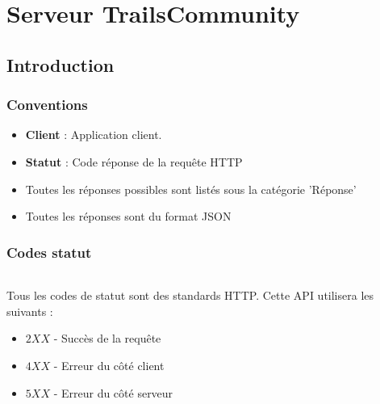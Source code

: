 \documentclass[titlepage, 12pt]{report}
\begin{document}


\part{Serveur TrailsCommunity}

\chapter{Introduction}

\section{Conventions}
\begin{itemize}
	\item \textbf{Client} : Application client.
	\item \textbf{Statut} : Code réponse de la requête HTTP
	\item Toutes les réponses possibles sont listés sous la catégorie 'Réponse'
	\item Toutes les réponses sont du format JSON
\end{itemize}


\section{Codes statut}

\paragraph{} Tous les codes de statut sont des standards HTTP. Cette API utilisera les suivants : 
\begin{itemize}
	\item $ 2XX $ - Succès de la requête
	\item $ 4XX $ - Erreur du côté client
	\item $ 5XX $ - Erreur du côté serveur		
\end{itemize}

\paragraph{}
\end{document}
